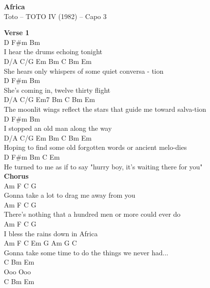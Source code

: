 \documentclass[a4paper]{article}
\begin{document}
    \begin{center}
        \textbf{Africa}
        ~\\
        Toto -- TOTO IV (1982)
         -- Capo 3
    \end{center}
    {
        \scriptsize
        \textbf{Verse 1}
        ~\\
        {
            \cutive
            \obeyspaces
D                   F\#m     Bm
\\
I hear the drums echoing tonight
\\
D/A              C/G           Em         Bm   C Bm Em
\\
She hears only whispers of some quiet conversa - tion
\\
D                 F\#m           Bm
\\
She's coming in, twelve thirty flight
\\
D/A              C/G                    Em7              Bm   C Bm Em
\\
The moonlit wings reflect the stars that guide me toward salva-tion
\\
D              F\#m             Bm
\\
I stopped an old man along the way
\\
D/A                C/G            Em              Bm   C Bm Em
\\
Hoping to find some old forgotten words or ancient melo-dies
\\
D              F\#m       Bm                  C                Em
\\
He turned to me as if to say "hurry boy, it's waiting there for you"
\\

        }
        \textbf{Chorus}
        ~\\
        {
            \cutive
            \obeyspaces
Am          F               C        G
\\
Gonna take a lot to drag me away from you
\\
Am                     F             C               G
\\
There's nothing that a hundred men or more could ever do
\\
Am          F           C   G
\\
I bless the rains down in  Africa
\\
Am             F               C              Em G Am G C
\\
Gonna take some time to do the things we never had...
\\
    C Bm Em
\\
Ooo Ooo
\\
    C Bm Em
\\

}}
\end{document}
